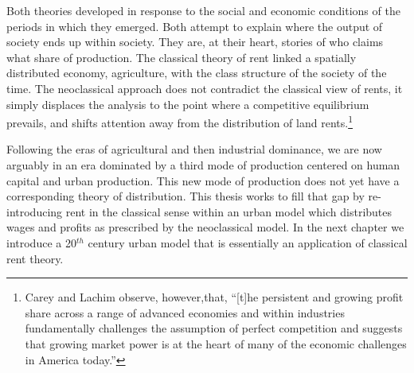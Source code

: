 Both theories developed in response to the social and economic conditions of the periods in which they emerged. Both attempt to explain where the output of society ends up within society. They are, at their heart, stories of who %
claims what share of production.
The classical theory of rent linked a spatially distributed economy, agriculture, with the class structure of the society of the time. The neoclassical approach does not contradict the classical view of rents, it simply displaces the analysis to the point where a competitive equilibrium prevails, and shifts attention away from the distribution of land rents.\footnote{Carey and Lachim \cite{careySomethingNothingHow2019} observe,  however,that, ``[t]he persistent and growing profit share across a range of advanced economies and within industries fundamentally challenges the assumption of perfect competition and suggests that growing market power is at the heart of many of the economic challenges in America today.'' } 

Following the eras of agricultural and then industrial dominance,  we are now arguably in an era dominated by a third mode of production centered on human capital and urban production. %
This new mode of production does not yet have a corresponding theory of distribution. This thesis works to fill that gap by re-introducing rent in the classical sense within an urban model which distributes wages and profits as prescribed by the neoclassical model. In the next chapter we introduce a 20$^{th}$ century urban model that is essentially an application of classical rent theory.



 
